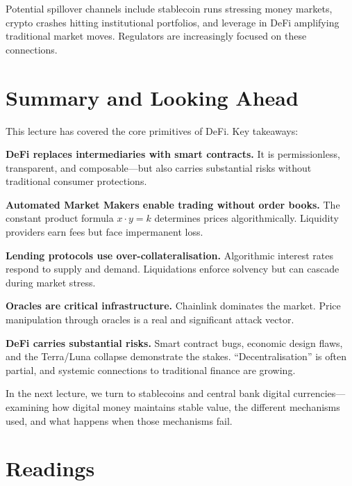 \documentclass[11pt,a4paper]{article}
\begin{document}
Potential spillover channels include stablecoin runs stressing money markets, crypto crashes hitting institutional portfolios, and leverage in DeFi amplifying traditional market moves. Regulators are increasingly focused on these connections.

\section{Summary and Looking Ahead}

This lecture has covered the core primitives of DeFi. Key takeaways:

\textbf{DeFi replaces intermediaries with smart contracts.} It is permissionless, transparent, and composable---but also carries substantial risks without traditional consumer protections.

\textbf{Automated Market Makers enable trading without order books.} The constant product formula $x \cdot y = k$ determines prices algorithmically. Liquidity providers earn fees but face impermanent loss.

\textbf{Lending protocols use over-collateralisation.} Algorithmic interest rates respond to supply and demand. Liquidations enforce solvency but can cascade during market stress.

\textbf{Oracles are critical infrastructure.} Chainlink dominates the market. Price manipulation through oracles is a real and significant attack vector.

\textbf{DeFi carries substantial risks.} Smart contract bugs, economic design flaws, and the Terra/Luna collapse demonstrate the stakes. ``Decentralisation'' is often partial, and systemic connections to traditional finance are growing.

In the next lecture, we turn to stablecoins and central bank digital currencies---examining how digital money maintains stable value, the different mechanisms used, and what happens when those mechanisms fail.

\section*{Readings}
\end{document}
